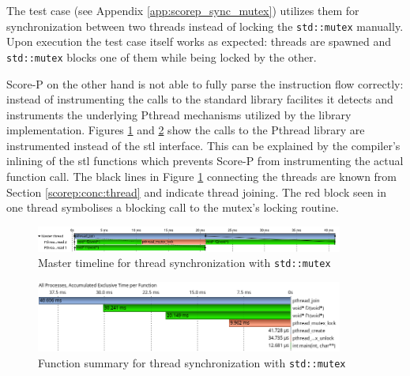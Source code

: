 The test case (see Appendix \ref{app:scorep_sync_mutex}) utilizes them for synchronization between two threads instead of locking the \texttt{std::mutex} manually. Upon execution the test case itself works as expected: threads are spawned and \texttt{std::mutex} blocks one of them while being locked by the other.

Score-P on the other hand is not able to fully parse the instruction flow correctly: instead of instrumenting the calls to the standard library facilites it detects and instruments the underlying Pthread mechanisms utilized by the library implementation. Figures \ref{scorep:sync_pthread_mutex_timeline} and \ref{scorep:sync_pthread_mutex_summary} show the calls to the Pthread library are instrumented instead of the \gls{stl} interface. This can be explained by the compiler's inlining of the \gls{stl} functions which prevents Score-P from instrumenting the actual function call. The black lines in Figure \ref{scorep:sync_pthread_mutex_timeline} connecting the threads are known from Section \ref{scorep:conc:thread} and indicate thread joining. The red block seen in one thread symbolises a blocking call to the mutex's locking routine.

\begin{figure}[htbp]
	\begin{center}
		\includegraphics[width=0.9\textwidth]{img/scorep_pthread_mutex_timeline.png}
		\caption{Master timeline for thread synchronization with \texttt{std::mutex}}
		\label{scorep:sync_pthread_mutex_timeline}
	\end{center}
\end{figure}

\begin{figure}[htbp]
	\begin{center}
		\includegraphics[width=0.9\textwidth]{img/scorep_pthread_mutex_summary.png}
		\caption{Function summary for thread synchronization with \texttt{std::mutex}}
		\label{scorep:sync_pthread_mutex_summary}
	\end{center}
\end{figure}

